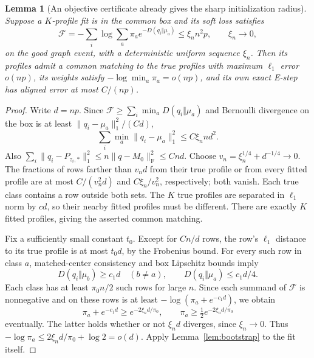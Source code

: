 \documentclass[11pt]{article}
\newtheorem{lemma}[theorem]{Lemma}
\newcommand{\F}{\mathrm F}
\begin{document}
\begin{lemma}[An objective certificate already gives the sharp initialization radius]\label{lem:certificate}
Suppose a $K$-profile fit is in the common box and its soft loss satisfies
\[
 \mathcal F=-\sum_i\log\sum_a\pi_a e^{-D(q_i\Vert\mu_a)}
 \le\xi_n n^2p,\qquad \xi_n\longrightarrow0,
\]
on the good graph event, with a deterministic uniform sequence $\xi_n$. Then its profiles admit a common matching to the true profiles with maximum $\ell_1$ error $o(np)$, its weights satisfy $-\log\min_a\pi_a=o(np)$, and its own exact E-step has aligned error at most $C/(np)$.
\end{lemma}
\begin{proof}
Write $d=np$. Since $\mathcal F\ge\sum_i\min_aD(q_i\Vert\mu_a)$ and Bernoulli divergence on the box is at least $\|q_i-\mu_a\|_1^2/(Cd)$,
\[
 \sum_i\min_a\|q_i-\mu_a\|_1^2\le C\xi_n n d^2.
\]
Also $\sum_i\|q_i-P_{z_i,*}\|_1^2\le n\|q-M_0\|_\F^2\le Cnd$. Choose $v_n=\xi_n^{1/4}+d^{-1/4}\to0$. The fractions of rows farther than $v_nd$ from their true profile or from every fitted profile are at most $C/(v_n^2d)$ and $C\xi_n/v_n^2$, respectively; both vanish. Each true class contains a row outside both sets. The $K$ true profiles are separated in $\ell_1$ norm by $c d$, so their nearby fitted profiles must be different. There are exactly $K$ fitted profiles, giving the asserted common matching.

Fix a sufficiently small constant $t_0$. Except for $Cn/d$ rows, the row's $\ell_1$ distance to its true profile is at most $t_0d$, by the Frobenius bound. For every such row in class $a$, matched-center consistency and box Lipschitz bounds imply
\[
 D(q_i\Vert\mu_b)\ge c_1d\quad(b\ne a),\qquad
 D(q_i\Vert\mu_a)\le c_1d/4.
\]
Each class has at least $\pi_0n/2$ such rows for large $n$. Since each summand of $\mathcal F$ is nonnegative and on these rows is at least $-\log(\pi_a+e^{-c_1d})$, we obtain
\[
 \pi_a+e^{-c_1d}\ge e^{-2\xi_nd/\pi_0},\qquad
 \pi_a\ge\tfrac12 e^{-2\xi_nd/\pi_0}
\]
eventually. The latter holds whether or not $\xi_nd$ diverges, since $\xi_n\to0$. Thus $-\log\pi_a\le2\xi_nd/\pi_0+\log2=o(d)$. Apply Lemma~\ref{lem:bootstrap} to the fit itself.
\end{proof}
\end{document}
